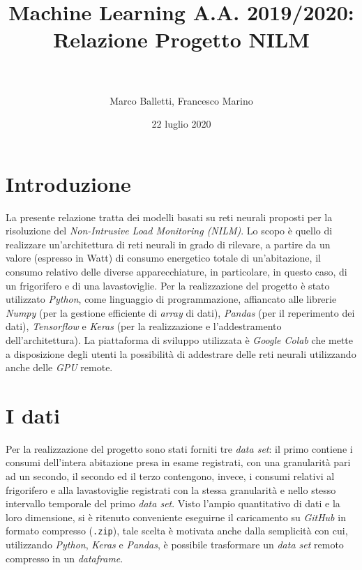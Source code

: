 \documentclass[12pt,a4paper,fleqn]{article}
\date{22 luglio 2020}
\author{\\\\\large Marco Balletti, Francesco Marino}
\title{Machine Learning A.A. 2019/2020:\\Relazione Progetto NILM}
\begin{document}
\maketitle

\section{Introduzione}
La presente relazione tratta dei modelli basati su reti neurali proposti per la risoluzione del \textsl{Non-Intrusive Load Monitoring (NILM)}. Lo scopo è quello di realizzare un'architettura di reti neurali in grado di rilevare, a partire da un valore (espresso in Watt) di consumo energetico totale di un'abitazione, il consumo relativo delle diverse apparecchiature, in particolare, in questo caso, di un frigorifero e di una lavastoviglie. Per la realizzazione del progetto è stato utilizzato \textsl{Python}, come linguaggio di programmazione, affiancato alle librerie \textsl{Numpy} (per la gestione efficiente di \textsl{array} di dati), \textsl{Pandas} (per il reperimento dei dati), \textsl{Tensorflow} e \textsl{Keras} (per la realizzazione e l'addestramento dell'architettura). La piattaforma di sviluppo utilizzata è \textsl{Google Colab} che mette a disposizione degli utenti la possibilità di addestrare delle reti neurali utilizzando anche delle \textsl{GPU} remote.

\section{I dati}
Per la realizzazione del progetto sono stati forniti tre  \textsl{data set}: il primo contiene i consumi dell'intera abitazione presa in esame registrati, con una granularità pari ad un secondo, il secondo ed il terzo contengono, invece, i consumi relativi al frigorifero e alla lavastoviglie registrati con la stessa granularità e nello stesso intervallo temporale del primo \textsl{data set}. 
Visto l'ampio quantitativo di dati e la loro dimensione, si è ritenuto conveniente eseguirne il caricamento su \textsl{GitHub} in formato compresso (\texttt{.zip}), tale scelta è motivata anche dalla semplicità con cui, utilizzando \textsl{Python}, \textsl{Keras} e \textsl{Pandas}, è possibile trasformare un \textsl{data set} remoto compresso in un \textsl{dataframe}.
\end{document}
